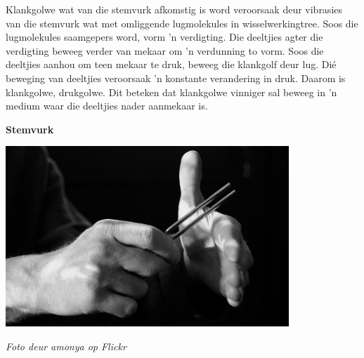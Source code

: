 \begin{minipage}{.5\textwidth}
Klankgolwe wat van die stemvurk afkomstig is word veroorsaak deur vibrasies van die stemvurk wat met omliggende lugmolekules in wisselwerkingtree. Soos die lugmolekules saamgepers word, vorm 'n verdigting. Die deeltjies agter die verdigting beweeg verder van mekaar om 'n verdunning to vorm. Soos die deeltjies aanhou om teen mekaar te druk, beweeg die klankgolf deur lug. Di\'{e} beweging van deeltjies veroorsaak 'n konstante verandering in druk. Daarom is klankgolwe, drukgolwe. Dit beteken dat klankgolwe vinniger sal beweeg in 'n medium waar die deeltjies nader aanmekaar is.\par

\end{minipage}
\begin{minipage}{.5\textwidth}\begin{center}
\textbf{Stemvurk}\par
    \includegraphics[width=0.8\textwidth]{../Grade10/photos/TuningFork2_Flickr_amonya.jpg}\par
\textit{Foto deur amonya op Flickr}
\end{center}
\end{minipage}

